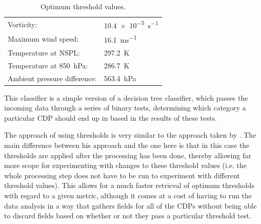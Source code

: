 \documentclass[pdftex,12pt,a4paper]{report}
\begin{document}
\begin{table}[hb!]
    \centering
    \begin{tabular}{ l l }
        Vorticity: & \SI{10.4e-5}{s^{-1}} \\
        Maximum wind speed: & \SI{16.1}{ms^{-1}} \\
        Temperature at NSPL: & \SI{297.2}{K} \\
        Temperature at \SI{850}{hPa}: & \SI{286.7}{K} \\
        Ambient pressure difference: & \SI{563.4}{hPa} \\
    \end{tabular}
    \caption{Optimum threshold values.}
    \label{tab:threshold_values}
\end{table}

This classifier is a simple version of a decision tree classifier, which passes the incoming data
through a series of binary tests, determining which category a particular CDP should end up in based
in the results of these tests.

The approach of using thresholds is very similar to the approach taken by
\textcite{walsh1997objective}. The main difference between his approach and the one here is that in
this case the thresholds are applied after the processing has been done, thereby allowing far more
scope for experimenting with changes to these threshold values (i.e. the whole processing step does
not have to be run to experiment with different threshold values). This allows for a much faster
retrieval of optimum thresholds with regard to a given metric, although it comes at a cost of having
to run the data analysis in a way that gathers fields for all of the CDPs without being able to
discard fields based on whether or not they pass a particular threshold test.
\end{document}
